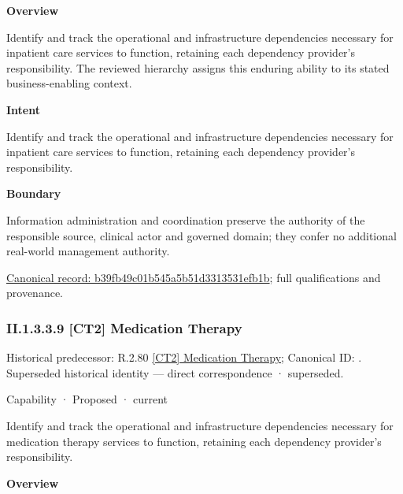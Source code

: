 \textbf{Overview}



Identify and track the operational and infrastructure dependencies necessary for inpatient care services to function, retaining each dependency provider's responsibility. The reviewed hierarchy assigns this enduring ability to its stated business-enabling context.



\textbf{Intent}



Identify and track the operational and infrastructure dependencies necessary for inpatient care services to function, retaining each dependency provider's responsibility.



\textbf{Boundary}



Information administration and coordination preserve the authority of the responsible source, clinical actor and governed domain; they confer no additional real-world management authority.


{\footnotesize \href{../../../../../../../continuum/strategy/capability/b39fb49c01b545a5b51d3313531efb1b.md}{Canonical record: b39fb49c01b545a5b51d3313531efb1b}; full qualifications and provenance.}\par
\subsubsection*{II.1.3.3.9 [CT2] Medication Therapy}
\label{navigation:II.1.3.3.9}

{\small Historical predecessor: R.2.80 \hyperref[element:db064e0cd4794479be1374e97a3d7e63]{[CT2] Medication Therapy}; Canonical ID: \texttt{}. Superseded historical identity — direct correspondence · superseded.}\par
\label{element:bb04996164c94e0c827a020432f4e498}
{\small Capability · Proposed · current}\par

Identify and track the operational and infrastructure dependencies necessary for medication therapy services to function, retaining each dependency provider's responsibility.



\textbf{Overview}



